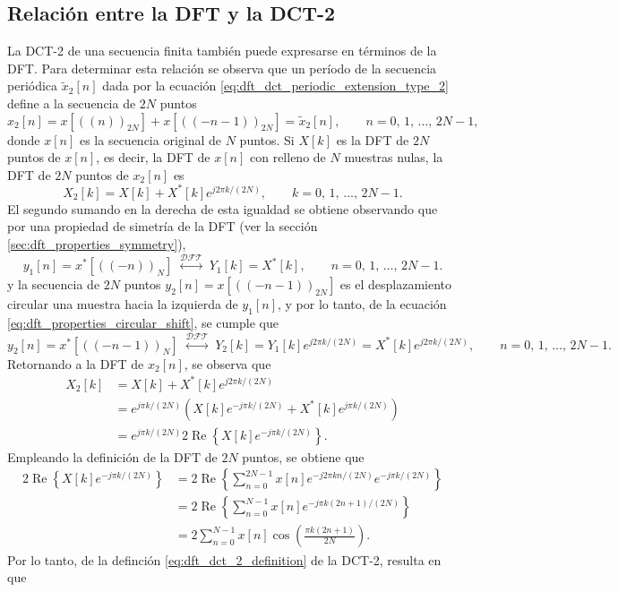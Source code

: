 \documentclass[a4paper]{report}
\renewcommand{\Re}{\operatorname{Re}}
\begin{document}
\subsection{Relación entre la DFT y la DCT-2}

La DCT-2 de una secuencia finita también puede expresarse en términos de la DFT. Para determinar esta relación se observa que un período de la secuencia periódica \(\tilde{x}_2[n]\) dada por la ecuación \ref{eq:dft_dct_periodic_extension_type_2} define a la secuencia de \(2N\) puntos
\[
 x_2[n]=x[((n))_{2N}]+x[((-n-1))_{2N}]=\tilde{x}_2[n],
 \qquad 
 n=0,\,1,\,\dots,\,2N-1,
\]
donde \(x[n]\) es la secuencia original de \(N\) puntos. Si \(X[k]\) es la DFT de \(2N\) puntos de \(x[n]\), es decir, la DFT de \(x[n]\) con relleno de \(N\) muestras nulas, la DFT de \(2N\) puntos de \(x_2[n]\) es 
\[
 X_2[k]=X[k]+X^*[k]e^{j2\pi k/(2N)},
 \qquad 
 k=0,\,1,\,\dots,\,2N-1.
\]
El segundo sumando en la derecha de esta igualdad se obtiene observando que por una propiedad de simetría de la DFT (ver la sección \ref{sec:dft_properties_symmetry}),
\[
 y_1[n]=x^*[((-n))_N]\;\overset{\mathcal{DFT}}{\longleftrightarrow}\;Y_1[k]=X^*[k],
 \qquad
 n=0,\,1,\,\dots,\,2N-1.
\]
y la secuencia de \(2N\) puntos \(y_2[n]=x[((-n-1))_{2N}]\) es el desplazamiento circular una muestra hacia la izquierda de \(y_1[n]\), y por lo tanto, de la ecuación \ref{eq:dft_properties_circular_shift}, se cumple que 
\[
 y_2[n]=x^*[((-n-1))_N]\;\overset{\mathcal{DFT}}{\longleftrightarrow}\;Y_2[k]=Y_1[k]e^{j2\pi k/(2N)}=X^*[k]e^{j2\pi k/(2N)},
 \qquad
 n=0,\,1,\,\dots,\,2N-1.
\]
Retornando a la DFT de \(x_2[n]\), se observa que 
\begin{align}
 X_2[k]&=X[k]+X^*[k]e^{j2\pi k/(2N)}\nonumber\\
  &=e^{j\pi k/(2N)}\left(X[k]e^{-j\pi k/(2N)}+X^*[k]e^{j\pi k/(2N)}\right)\nonumber\\
  &=e^{j\pi k/(2N)}2\Re\left\{X[k]e^{-j\pi k/(2N)}\right\}.\label{eq:dft_dct_2_relation_with_dft_X2_tmp}
\end{align}
Empleando la definición de la DFT de \(2N\) puntos, se obtiene que
\begin{align*}
 2\Re\left\{X[k]e^{-j\pi k/(2N)}\right\}&=2\Re\left\{\sum_{n=0}^{2N-1}x[n]e^{-j2\pi kn/(2N)}e^{-j\pi k/(2N)}\right\}\\
  &=2\Re\left\{\sum_{n=0}^{N-1}x[n]e^{-j\pi k(2n+1)/(2N)}\right\}\\
  &=2\sum_{n=0}^{N-1}x[n]\cos\left(\frac{\pi k(2n+1)}{2N}\right).
\end{align*}
Por lo tanto, de la definción \ref{eq:dft_dct_2_definition} de la DCT-2, resulta en que 
\end{document}
